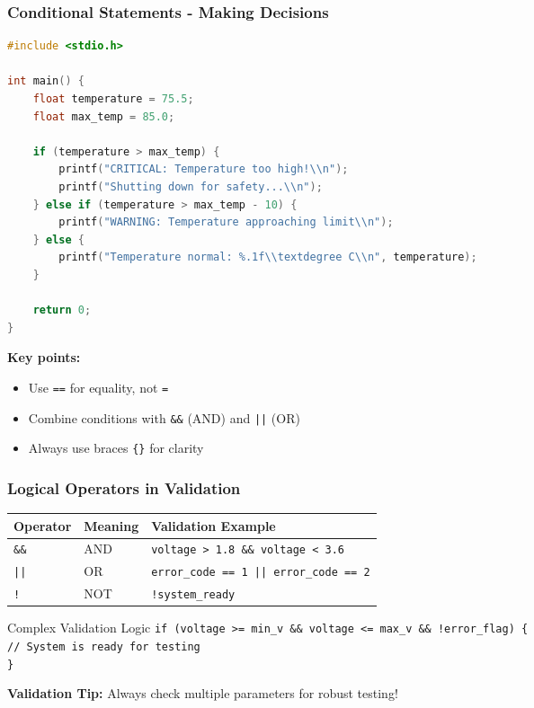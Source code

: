 \documentclass{beamer}
\begin{document}
\begin{frame}[fragile]
\frametitle{Conditional Statements - Making Decisions}
\begin{lstlisting}[language=C]
#include <stdio.h>

int main() {
    float temperature = 75.5;
    float max_temp = 85.0;

    if (temperature > max_temp) {
        printf("CRITICAL: Temperature too high!\\n");
        printf("Shutting down for safety...\\n");
    } else if (temperature > max_temp - 10) {
        printf("WARNING: Temperature approaching limit\\n");
    } else {
        printf("Temperature normal: %.1f\\textdegree C\\n", temperature);
    }

    return 0;
}
\end{lstlisting}

\textbf{Key points:}
\begin{itemize}
    \item Use \texttt{==} for equality, not \texttt{=}
    \item Combine conditions with \texttt{\&\&} (AND) and \texttt{||} (OR)
    \item Always use braces \texttt{\{\}} for clarity
\end{itemize}
\end{frame}

\begin{frame}
\frametitle{Logical Operators in Validation}
\begin{center}
\begin{tabular}{|l|l|l|}
\hline
\textbf{Operator} & \textbf{Meaning} & \textbf{Validation Example} \\
\hline
\texttt{\&\&} & AND & \texttt{voltage > 1.8 \&\& voltage < 3.6} \\
\texttt{||} & OR & \texttt{error\_code == 1 || error\_code == 2} \\
\texttt{!} & NOT & \texttt{!system\_ready} \\
\hline
\end{tabular}
\end{center}

\vspace{0.5cm}
\begin{exampleblock}{Complex Validation Logic}
\texttt{if (voltage >= min\_v \&\& voltage <= max\_v \&\& !error\_flag) \{\\
\quad // System is ready for testing\\
\}}
\end{exampleblock}

\vspace{0.5cm}
\textbf{Validation Tip:} Always check multiple parameters for robust testing!
\end{frame}
\end{document}
